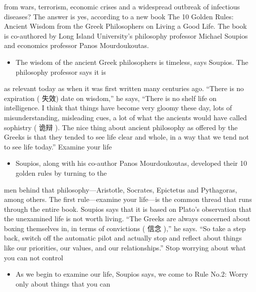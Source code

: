 \documentclass[UTF8,11pt]{ctexart}
\begin{document}
from wars, terrorism, economic crises and a widespread outbreak of infectious diseases? The answer is yes, according to a new book The 10 Golden Rules: Ancient Wisdom from the Greek Philosophers on Living a Good Life. The book is co-authored by Long Island University’s philosophy professor Michael Soupios and economics professor Panos Mourdoukoutas.


\begin{itemize}[leftmargin=2em,itemsep=.2em,topsep=.4em]\item[B.] The wisdom of the ancient Greek philosophers is timeless, says Soupios. The philosophy professor says it is
\end{itemize}

as relevant today as when it was first written many centuries ago. “There is no expiration ( 失效) date on wisdom,” he says, “There is no shelf life on intelligence. I think that things have become very gloomy these day, lots of misunderstanding, misleading cues, a lot of what the ancients would have called sophistry ( 诡辩 ). The nice thing about ancient philosophy as offered by the Greeks is that they tended to see life clear and whole, in a way that we tend not to see life today.” Examine your life


\begin{itemize}[leftmargin=2em,itemsep=.2em,topsep=.4em]\item[C.] Soupios, along with his co-author Panos Mourdoukoutas, developed their 10 golden rules by turning to the
\end{itemize}

men behind that philosophy—Aristotle, Socrates, Epictetus and Pythagoras, among others. The first rule—examine your life—is the common thread that runs through the entire book. Soupios says that it is based on Plato’s observation that the unexamined life is not worth living. “The Greeks are always concerned about boxing themselves in, in terms of convictions ( 信念 ),” he says. “So take a step back, switch off the automatic pilot and actually stop and reflect about things like our priorities, our values, and our relationships.” Stop worrying about what you can not control


\begin{itemize}[leftmargin=2em,itemsep=.2em,topsep=.4em]\item[D.] As we begin to examine our life, Soupios says, we come to Rule No.2: Worry only about things that you can
\end{itemize}
\end{document}
